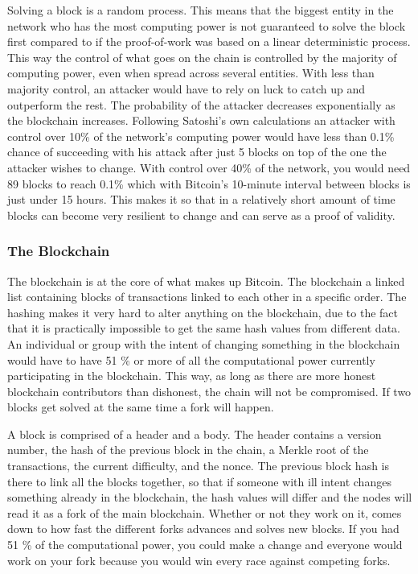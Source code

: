 \documentclass[12pt]{article}
\begin{document}

Solving a block is a random process. This means that the biggest entity in the network who has the most computing power is not guaranteed to solve the block first compared to if the proof-of-work was based on a linear deterministic process. This way the control of what goes on the chain is controlled by the majority of computing power, even when spread across several entities. With less than majority control, an attacker would have to rely on luck to catch up and outperform the rest. The probability of the attacker decreases exponentially as the blockchain increases. Following Satoshi's own calculations\cite{nakamoto2009bitcoin} an attacker with control over 10\% of the network's computing power would have less than 0.1\% chance of succeeding with his attack after just 5 blocks on top of the one the attacker wishes to change. With control over 40\% of the network, you would need 89 blocks to reach 0.1\% which with Bitcoin's 10-minute interval between blocks is just under 15 hours. This makes it so that in a relatively short amount of time blocks can become very resilient to change and can serve as a proof of validity.

\subsubsection{The Blockchain} %

The blockchain is at the core of what makes up Bitcoin. The blockchain a linked list containing blocks of transactions linked to each other in a specific order. The hashing makes it very hard to alter anything on the blockchain, due to the fact that it is practically impossible to get the same hash values from different data. An individual or group with the intent of changing something in the blockchain would have to have 51 \% or more of all the computational power currently participating in the blockchain. This way, as long as there are more honest blockchain contributors than dishonest, the chain will not be compromised. If two blocks get solved at the same time a fork will happen. %

A block is comprised of a header and a body. The header contains a version number, the hash of the previous block in the chain, a Merkle root of the transactions, the current difficulty, and the nonce. The previous block hash is there to link all the blocks together, so that if someone with ill intent changes something already in the blockchain, the hash values will differ and the nodes will read it as a fork of the main blockchain. Whether or not they work on it, comes down to how fast the different forks advances and solves new blocks. If you had 51 \% of the computational power, you could make a change and everyone would work on your fork because you would win every race against competing forks.
\end{document}
